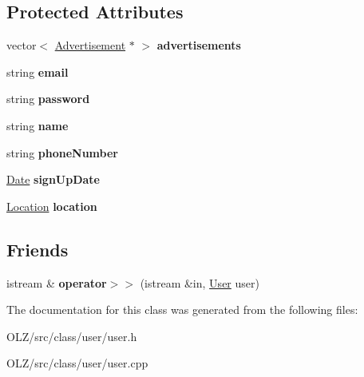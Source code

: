 \subsection*{Protected Attributes}
\begin{DoxyCompactItemize}
\item 
\hypertarget{class_user_a9a78e0f9ab50c5d9d3041d1d90acd4d8}{}vector$<$ \hyperlink{class_advertisement}{Advertisement} $\ast$ $>$ {\bfseries advertisements}\label{class_user_a9a78e0f9ab50c5d9d3041d1d90acd4d8}

\item 
\hypertarget{class_user_a2d678acd22b533660b4b7d8404961f14}{}string {\bfseries email}\label{class_user_a2d678acd22b533660b4b7d8404961f14}

\item 
\hypertarget{class_user_ab537b9a55bc7d7fcafcdf8e53d085e67}{}string {\bfseries password}\label{class_user_ab537b9a55bc7d7fcafcdf8e53d085e67}

\item 
\hypertarget{class_user_a643f85779a4693855c171c396f49e515}{}string {\bfseries name}\label{class_user_a643f85779a4693855c171c396f49e515}

\item 
\hypertarget{class_user_a727ba647fe019be6fa9c03308d60da9e}{}string {\bfseries phone\+Number}\label{class_user_a727ba647fe019be6fa9c03308d60da9e}

\item 
\hypertarget{class_user_ab508f13f113618c508641e7f47932cc9}{}\hyperlink{class_date}{Date} {\bfseries sign\+Up\+Date}\label{class_user_ab508f13f113618c508641e7f47932cc9}

\item 
\hypertarget{class_user_a1c8e68a346c8a47d8cf0e75356c66562}{}\hyperlink{class_location}{Location} {\bfseries location}\label{class_user_a1c8e68a346c8a47d8cf0e75356c66562}

\end{DoxyCompactItemize}
\subsection*{Friends}
\begin{DoxyCompactItemize}
\item 
\hypertarget{class_user_a450594b5d214c6f0e33a61a070d77422}{}istream \& {\bfseries operator$>$$>$} (istream \&in, \hyperlink{class_user}{User} user)\label{class_user_a450594b5d214c6f0e33a61a070d77422}

\end{DoxyCompactItemize}


The documentation for this class was generated from the following files\+:\begin{DoxyCompactItemize}
\item 
O\+L\+Z/src/class/user/user.\+h\item 
O\+L\+Z/src/class/user/user.\+cpp\end{DoxyCompactItemize}
